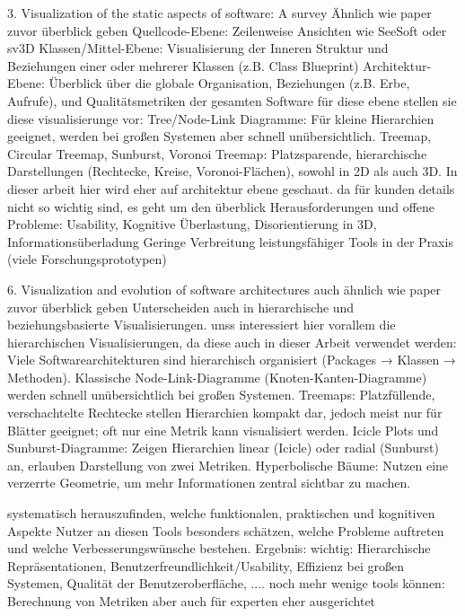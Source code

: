 3. Visualization of the static aspects of software: A survey \cite{staticSurvey}
Ähnlich wie paper zuvor überblick geben
Quellcode-Ebene: Zeilenweise Ansichten wie SeeSoft oder sv3D
Klassen/Mittel-Ebene: Visualisierung der Inneren Struktur und Beziehungen einer oder mehrerer Klassen (z.B. Class Blueprint)
Architektur-Ebene: Überblick über die globale Organisation, Beziehungen (z.B. Erbe, Aufrufe), und Qualitätsmetriken der gesamten Software
für diese ebene stellen sie diese visualisierunge vor:
Tree/Node-Link Diagramme: Für kleine Hierarchien geeignet, werden bei großen Systemen aber schnell unübersichtlich.
Treemap, Circular Treemap, Sunburst, Voronoi Treemap: Platzsparende, hierarchische Darstellungen (Rechtecke, Kreise, Voronoi-Flächen), sowohl in 2D als auch 3D.
In dieser arbeit hier wird eher auf architektur ebene geschaut. da für kunden details nicht so wichtig sind, es geht um den überblick
Herausforderungen und offene Probleme:
Usability, Kognitive Überlastung, Disorientierung in 3D, Informationsüberladung
Geringe Verbreitung leistungsfähiger Tools in der Praxis (viele Forschungsprototypen)


6. Visualization and evolution of software architectures \cite{visualizationEvolution}
auch ähnlich wie paper zuvor überblick geben
Unterscheiden auch in hierarchische und beziehungsbasierte Visualisierungen. unss interessiert hier vorallem die hierarchischen Visualisierungen, da diese auch in dieser Arbeit verwendet werden:
Viele Softwarearchitekturen sind hierarchisch organisiert (Packages → Klassen → Methoden).
Klassische Node-Link-Diagramme (Knoten-Kanten-Diagramme) werden schnell unübersichtlich bei großen Systemen.
Treemaps: Platzfüllende, verschachtelte Rechtecke stellen Hierarchien kompakt dar, jedoch meist nur für Blätter geeignet; oft nur eine Metrik kann visualisiert werden.
Icicle Plots und Sunburst-Diagramme: Zeigen Hierarchien linear (Icicle) oder radial (Sunburst) an, erlauben Darstellung von zwei Metriken.
Hyperbolische Bäume: Nutzen eine verzerrte Geometrie, um mehr Informationen zentral sichtbar zu machen.




\cite{bassil2001software}
systematisch herauszufinden, welche funktionalen, praktischen und kognitiven Aspekte Nutzer an diesen Tools besonders schätzen, welche Probleme auftreten und welche Verbesserungswünsche bestehen.
Ergebnis: wichtig: Hierarchische Repräsentationen, Benutzerfreundlichkeit/Usability, Effizienz bei großen Systemen, Qualität der Benutzeroberfläche, .... noch mehr
wenige tools können: Berechnung von Metriken
aber auch für experten eher ausgerichtet


